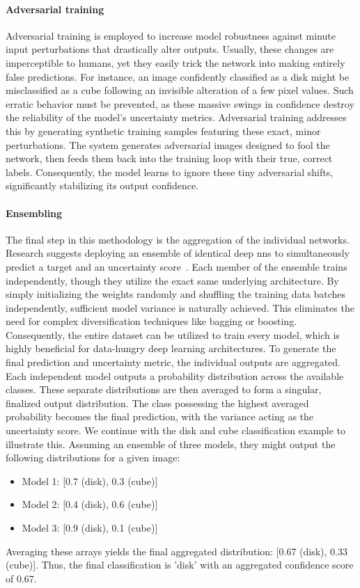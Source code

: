 \paragraph{Adversarial training}
Adversarial training is employed to increase model robustness against minute input perturbations that drastically alter outputs.
Usually, these changes are imperceptible to humans, yet they easily trick the network into making entirely false predictions.
For instance, an image confidently classified as a disk might be misclassified as a cube following an invisible alteration of a few pixel values.
Such erratic behavior must be prevented, as these massive swings in confidence destroy the reliability of the model's uncertainty metrics.
Adversarial training addresses this by generating synthetic training samples featuring these exact, minor perturbations.
The system generates adversarial images designed to fool the network, then feeds them back into the training loop with their true, correct labels.
Consequently, the model learns to ignore these tiny adversarial shifts, significantly stabilizing its output confidence.

\paragraph{Ensembling}
The final step in this methodology is the aggregation of the individual networks.
Research suggests deploying an ensemble of identical deep \glspl{nn} to simultaneously predict a target and an uncertainty score~\cite{src:deep-ensemble-methods}.
Each member of the ensemble trains independently, though they utilize the exact same underlying architecture.
By simply initializing the weights randomly and shuffling the training data batches independently, sufficient model variance is naturally achieved.
This eliminates the need for complex diversification techniques like bagging or boosting.
Consequently, the entire dataset can be utilized to train every model, which is highly beneficial for data-hungry deep learning architectures.
To generate the final prediction and uncertainty metric, the individual outputs are aggregated.
Each independent model outputs a probability distribution across the available classes.
These separate distributions are then averaged to form a singular, finalized output distribution.
The class possessing the highest averaged probability becomes the final prediction, with the variance acting as the uncertainty score.
We continue with the disk and cube classification example to illustrate this.
Assuming an ensemble of three models, they might output the following distributions for a given image:
\begin{itemize}
    \item Model 1: [0.7 (disk), 0.3 (cube)]
    \item Model 2: [0.4 (disk), 0.6 (cube)]
    \item Model 3: [0.9 (disk), 0.1 (cube)]
\end{itemize}
Averaging these arrays yields the final aggregated distribution: [0.67 (disk), 0.33 (cube)].
Thus, the final classification is 'disk' with an aggregated confidence score of 0.67.

